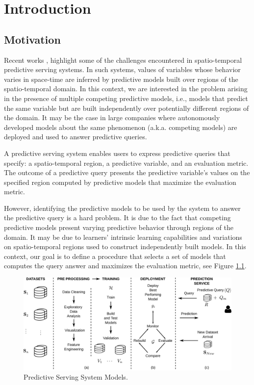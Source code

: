 \chapter[Introduction]{Introduction}\label{chap_intro}

\section{Motivation}
\label{Sec:Motivation}

Recent works \cite{Ghanta022019, Crankshaw2017, Polyzotis2018}, highlight some of the challenges encountered in spatio-temporal predictive serving systems. In such systems, values of variables whose behavior varies in space-time are inferred by predictive models built over regions of the spatio-temporal domain. In this context, we are interested in the problem arising in the presence of multiple competing predictive models, i.e., models that predict the same variable but are built independently over potentially different regions of the domain. It may be the case in large companies where autonomously developed models about the same phenomenon (a.k.a. competing models) are deployed and used to answer predictive queries. 

A predictive serving system enables users to express predictive queries that specify: a spatio-temporal region, a predictive variable, and an evaluation metric. The outcome of a predictive query presents the predictive variable's values on the specified region computed by predictive models that maximize the evaluation metric. 

However, identifying the predictive models to be used by the system to answer the predictive query is a hard problem. It is due to the fact that competing predictive models present varying predictive behavior through regions of the domain. It may be due to learners' intrinsic learning capabilities and variations on spatio-temporal regions used to construct independently built models. In this context, our goal is to define a procedure that selects a set of models that computes the query answer and maximizes the evaluation metric, see Figure \ref{Fig:MotiPoster}. 

\begin{figure}[h]
	\centering
	\includegraphics[scale=0.3]{../Figures/ModelManagementPS-VersionCompleta}
	\caption{Predictive Serving System Models.}
	\label{Fig:MotiPoster}
\end{figure}

